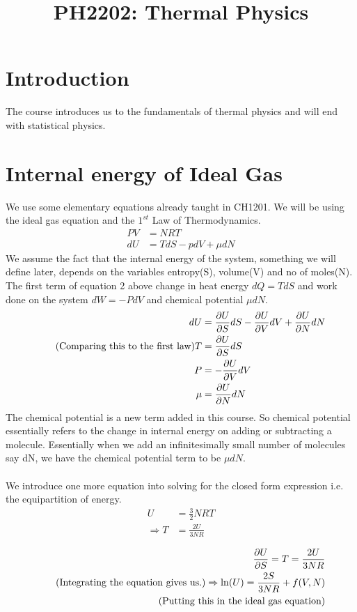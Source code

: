 \documentclass[a4paper]{article}
\title{PH2202: Thermal Physics}
\begin{document}
\maketitle
    \newpage
    \tableofcontents
    \newpage 
    \section{Introduction}
    The course introduces us to the fundamentals of thermal physics and will end with statistical
    physics. 
    
    \section{Internal energy of Ideal Gas}
    We use some elementary equations already taught in CH1201. We will be using the ideal gas 
    equation and the $1^{st}$ Law of Thermodynamics. 
    \begin{align*}
        PV &= NRT \\ 
        dU &= TdS - pdV + \mu dN
    \end{align*}
    We assume the fact that the internal energy of the system, something we will define later,
    depends on the variables entropy(S), volume(V) and no of moles(N). The first term of equation
    2 above change in heat energy $dQ = TdS$ and work done on the system $dW = -PdV$ and 
    chemical potential $\mu dN$. 
    \begin{align*}
        dU &= \pdv{U}{S}dS - \pdv{U}{V}dV + \pdv{U}{N}dN \\ 
        \tag{Comparing this to the first law} 
        T &= \pdv{U}{S}dS\\ 
        P &= - \pdv{U}{V}dV \\ 
        \mu &= \pdv{U}{N}dN 
    \end{align*}
    The chemical potential is a new term added in this course. %
    So chemical potential essentially refers to the change in internal energy on adding or 
    subtracting a molecule. Essentially when we add an infinitesimally small number of molecules
    say dN, we have the chemical potential term to be $\mu dN$.\\[5]
    \\[5]
    We introduce one more equation into solving for the closed form expression i.e. the 
    equipartition of energy.
    \begin{align*}
        U &= \frac{3}{2} NRT \\ 
        \Rightarrow T & = \frac{2U}{3NR}\\ 
    \end{align*}
    \begin{align*}
        \pdv{U}{S} = T = \frac{2U}{3NR}\\ 
        \tag{Integrating the equation gives us.}
        \Rightarrow \ln (U) = \frac{2S}{3NR}+ f(V,N) \\ 
        \tag{Putting this in the ideal gas equation}
    \end{align*}
\end{document}
